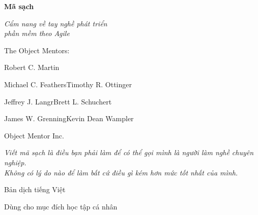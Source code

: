 \documentclass[10pt,twoside,openright]{book}
\begin{document}
\frontmatter
\pagestyle{main}

\begin{titlepage}
\thispagestyle{empty}
\centering
\vspace*{58pt}
{\fontsize{34}{40}\selectfont\bfseries Mã sạch\par}
\vspace{16pt}
{\fontsize{17}{22}\selectfont\itshape Cẩm nang về tay nghề phát triển\\
phần mềm theo Agile\par}
\vspace{54pt}
{\fontsize{12}{15}\selectfont The Object Mentors:\par}
\vspace{6pt}
{\fontsize{10}{13}\selectfont
Robert C. Martin\par
Michael C. Feathers\quad Timothy R. Ottinger\par
Jeffrey J. Langr\quad Brett L. Schuchert\par
James W. Grenning\quad Kevin Dean Wampler\par
Object Mentor Inc.\par}
\vfill
{\fontsize{9.5}{13}\selectfont\itshape
Viết mã sạch là điều bạn phải làm để có thể gọi mình là người làm nghề chuyên nghiệp.\\
Không có lý do nào để làm bất cứ điều gì kém hơn mức tốt nhất của mình.\par}
\vspace{40pt}
{\fontsize{10}{13}\selectfont Bản dịch tiếng Việt\par}
\vspace{6pt}
{\fontsize{9}{11}\selectfont Dùng cho mục đích học tập cá nhân\par}
\vspace{14pt}
\end{titlepage}
\end{document}

